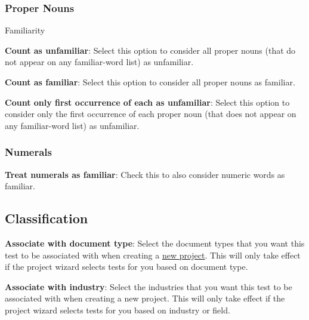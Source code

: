 \documentclass[
]{book}
\newenvironment{optionssection}
    {
    \begin{tcolorbox}[colframe=lightgray,colback=ultralightgray,sharp corners=all,parbox=false]
    }
    {
    \end{tcolorbox}
    }
\newenvironment{optionssectiontitle}
    {
    \begin{tcolorbox}[colframe=lightgray,colback=lightgray]
    \bfseries
    }
    {
    \end{tcolorbox}
    }
\theoremstyle{definition}
\theoremstyle{definition}
\theoremstyle{definition}
\theoremstyle{definition}
\theoremstyle{remark}
\begin{document}
\hypertarget{proper-nouns}{%
\subsubsection*{Proper Nouns}\label{proper-nouns}}

\begin{optionssection}

\begin{optionssectiontitle}
Familiarity

\end{optionssectiontitle}

\textbf{Count as unfamiliar}: Select this option to consider all proper nouns (that do not appear on any familiar-word list) as unfamiliar.

\textbf{Count as familiar}: Select this option to consider all proper nouns as familiar.

\textbf{Count only first occurrence of each as unfamiliar}: Select this option to consider only the first occurrence of each proper noun (that does not appear on any familiar-word list) as unfamiliar.

\end{optionssection}

\hypertarget{numerals}{%
\subsubsection*{Numerals}\label{numerals}}

\textbf{Treat numerals as familiar}: Check this to also consider numeric words as familiar.

\hypertarget{classification}{%
\subsection*{Classification}\label{classification}}

\textbf{Associate with document type}: Select the document types that you want this test to be associated with when creating a \protect\hyperlink{creating-standard-project}{new project}. This will only take effect if the project wizard selects tests for you based on document type.

\textbf{Associate with industry}: Select the industries that you want this test to be associated with when creating a new project. This will only take effect if the project wizard selects tests for you based on industry or field.
\end{document}
